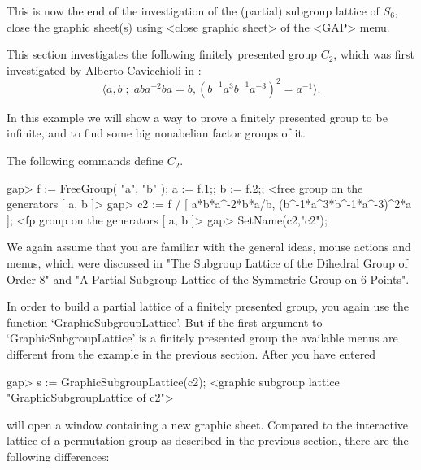 
This is  now the  end  of the investigation   of  the (partial)  subgroup
lattice   of  $S_6$, close the    graphic  sheet(s) using  <close graphic
sheet> of the <GAP> menu.



This  section  investigates the  following  finitely presented group $C_2$,
which was first investigated by Alberto Cavicchioli in \cite{Cav86}:
$$
\langle a, b \;;\; aba^{-2}ba=b, (b^{-1}a^3b^{-1}a^{-3})^2=a^{-1}\rangle.
$$

In this example we will show a way to prove a finitely presented group
to be infinite, and to find some big nonabelian factor groups of it.

The following {\GAP} commands define $C_2$.

\begintt
gap> f := FreeGroup( "a", "b" );  a := f.1;;  b := f.2;;
<free group on the generators [ a, b ]>
gap> c2 := f / [ a*b*a^-2*b*a/b, (b^-1*a^3*b^-1*a^-3)^2*a ];
<fp group on the generators [ a, b ]>
gap> SetName(c2,"c2");
\endtt

We again assume that you are familiar with the general ideas, mouse actions
and menus, which were discussed in "The Subgroup Lattice of the Dihedral
Group of Order 8" and "A Partial Subgroup Lattice of the Symmetric Group on
6 Points".

In order  to build a  partial lattice of a  finitely presented group, you
again use the function  `GraphicSubgroup\-Lattice'.  But if the first  argument
to `GraphicSubgroupLattice' is a finitely presented group the available menus
are different  from the example in  the previous section.  After you have
entered

\begintt
gap> s := GraphicSubgroupLattice(c2);
<graphic subgroup lattice "GraphicSubgroupLattice of c2">
\endtt

{\XGAP} will open a window containing a new graphic sheet.  Compared to the
interactive lattice of a permutation group as described in the previous
section, there are the following differences: 


